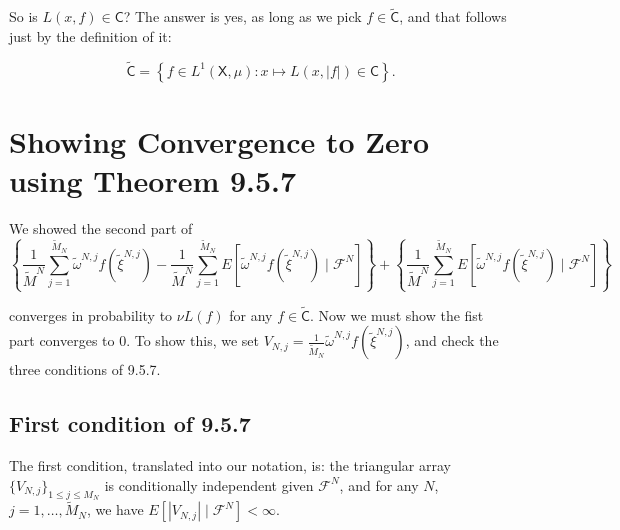 \documentclass{article}
\begin{document}
So is $L(x, f) \in \mathsf{C}$? The answer is yes, as long as we pick $f \in \tilde{\mathsf{C}}$, and that follows just by the definition of it:

$$
\tilde{\mathsf{C}} = \left\{ f \in L^1(\mathsf{X}, \mu) : x \mapsto L(x, |f|) \in \mathsf{C}  \right\}.
$$

\section{Showing Convergence to Zero using Theorem 9.5.7}

We showed the second part of
$$  
\left\{
\frac{1}{\tilde{M}^N} \sum_{j=1}^{\tilde{M}_N} \tilde{\omega}^{N,j} f(\tilde{\xi}^{N,j}) 
- \frac{1}{\tilde{M}^N} \sum_{j=1}^{\tilde{M}_N} E\left[ \tilde{\omega}^{N,j} f(\tilde{\xi}^{N,j}) \mid \mathcal{F}^N \right]  \right\}
+ \left\{ \frac{1}{\tilde{M}^N} \sum_{j=1}^{\tilde{M}_N} E\left[ \tilde{\omega}^{N,j} f(\tilde{\xi}^{N,j}) \mid \mathcal{F}^N \right]  \right\}
$$

converges in probability to $\nu L(f)$ for any $f \in \tilde{\mathsf{C}}$. Now we must show the fist part converges to $0$. To show this, we set $V_{N,j} = \frac{1}{\tilde{M}_{N}} \tilde{\omega}^{N,j} f(\tilde{\xi}^{N,j})$, and check the three conditions of 9.5.7. 

\subsection{First condition of 9.5.7}

The first condition, translated into our notation, is: the triangular array $\{V_{N,j}\}_{1 \le j \le M_N}$ is conditionally independent given $\mathcal{F}^N$, and for any $N$, $j=1,\ldots, \tilde{M}_N$, we have $E[|V_{N,j}| \mid \mathcal{F}^N] < \infty$. 
\newline

% 
% 
% 
% 
% 
\end{document}
